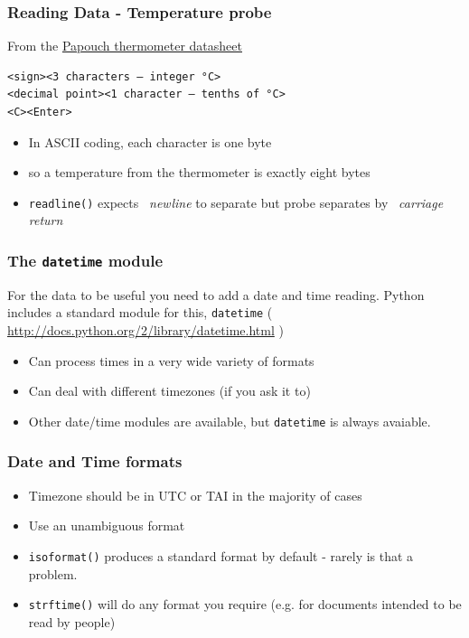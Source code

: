 \documentclass[aspectratio=1610,9pt]{beamer} %
\begin{document}
\begin{frame}[fragile]
\frametitle{Reading Data - Temperature probe}

From the \href{http://www.papouch.com/en/shop/product/tm-rs232-thermometer/tm_en.pdf}{Papouch thermometer datasheet}


\begin{verbatim}
<sign><3 characters – integer °C>
<decimal point><1 character – tenths of °C>
<C><Enter>
\end{verbatim}

\begin{itemize}
\item In ASCII coding, each character is one byte
\item so a temperature from the thermometer is exactly eight bytes
\item \texttt{readline()} expects {\itshape~newline} to separate but probe separates by {\itshape~carriage return}
\end{itemize}

\end{frame}
\begin{frame}
\frametitle{The \texttt{datetime} module}

For the data to be useful you need to add a date and time reading.
Python includes a standard module for this, \texttt{datetime} (
\url{http://docs.python.org/2/library/datetime.html}
)
\begin{itemize}
\item Can process times in a very wide variety of formats
\item Can deal with different timezones (if you ask it to)
\item Other date/time modules are available, but \texttt{datetime} is always avaiable.
\end{itemize}
\end{frame}
\begin{frame}[fragile]
\frametitle{Date and Time formats}

\begin{itemize}
\itemsep1pt\parskip0pt
\item
  Timezone should be in UTC or TAI in the majority of cases
\item
  Use an unambiguous format
\item
  \texttt{isoformat()} produces a standard format by default - rarely is
  that a problem.
\item
  \texttt{strftime()} will do any format you require (e.g. for documents
  intended to be read by people)
\end{itemize}

\end{frame}
\end{document}
